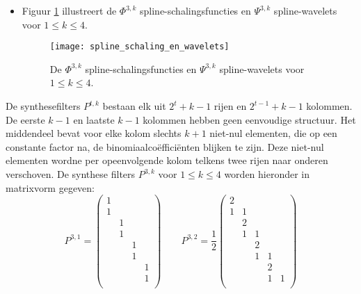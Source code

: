 \begin{enumerate}
			
	{
		\begin{itemize} 
			\item Figuur \ref{fig:spline_schaling_wavelet} illustreert de $\Phi^{3, k}$ spline-schalingsfuncties en $\Psi^{3, k}$ spline-wavelets voor  $1 \leq k \leq 4$.
			\begin{figure}[ht]
				\centering
				\texttt{[image: spline\_schaling\_en\_wavelets]}
				\caption{De $\Phi^{3, k}$ spline-schalingsfuncties en $\Psi^{3, k}$ spline-wavelets voor $1 \leq k \leq 4$.}
				\label{fig:spline_schaling_wavelet}
			\end{figure}
		\end{itemize}
		}
		De synthesefilters $P^{t, k}$ bestaan elk uit $2^t + k -1$ rijen en $2^{t - 1} + k - 1$ kolommen. De eerste $k-1$ en laatste $k-1$ kolommen hebben geen eenvoudige structuur. Het middendeel bevat voor elke kolom slechts $k + 1$ niet-nul elementen, die op een constante factor na, de binomiaalcoëfficiënten blijken te zijn. Deze niet-nul elementen wordne per opeenvolgende kolom telkens twee rijen naar onderen verschoven. De synthese filters $P^{3, k}$ voor $1 \leq k \leq 4$ worden hieronder in matrixvorm gegeven:
		$$
		P^{3, 1} = 
		\begin{pmatrix}
			1 &   &   &   \\
			1 &   &   &   \\
			  & 1 &   &   \\
			  & 1 &   &   \\
			  &   & 1 &   \\
			  &   & 1 &  \\
			  &   &   & 1 \\
			  &   &   & 1 \\
		\end{pmatrix}
		\qquad
		P^{3, 2} = \frac{1}{2}
		\begin{pmatrix}
			2 &   &   &   & \\
			1 & 1 &   &   & \\
			  & 2 &   &   & \\
			  & 1 & 1 &   & \\
			  &   & 2 &   & \\
			  &   & 1 & 1 & \\
			  &   &   & 2 & \\
			  &   &   & 1 & 1\\

\end{pmatrix}$$
\end{enumerate}
